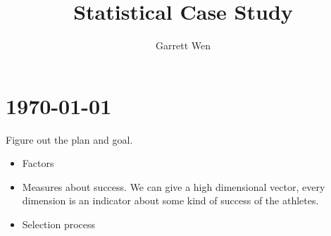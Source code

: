 \documentclass[11pt]{article}
\title{Statistical Case Study}
\author{Garrett Wen}
\begin{document}
\maketitle
\tableofcontents
\section{\today}

Figure out the plan and goal.


\begin{itemize}
	\item Factors
	\item Measures about success.
	We can give a high dimensional vector, every dimension is an indicator about some kind of success of the athletes. 
	\item Selection process
\end{itemize}


\end{document}
